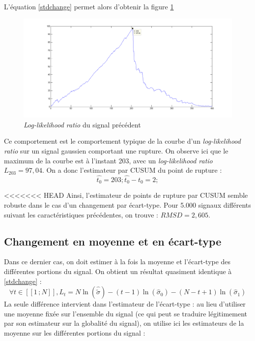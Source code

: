 \documentclass[french,12pt,notitlepage]{report}
\begin{document}
	L'équation \ref{stdchange} permet alors d'obtenir la figure \ref{llr_test_std}
	
	\begin{figure}[h]
		\includegraphics[scale=0.4]{llr_test_std.png}
		\caption{\textit{Log-likelihood ratio} du signal précédent}
		\label{llr_test_std}
	\end{figure}
	
	Ce comportement est le comportement typique de la courbe d'un \textit{log-likelihood ratio} sur un signal gaussien comportant une rupture. On observe ici que le maximum de la courbe est à l'instant 203, avec un \textit{log-likelihood ratio} $L_203 = 97,04$. On a donc l'estimateur par CUSUM du point de rupture :
	\begin{equation*}
		\hat{t_0} = 203 ; \hat{t_0} - t_0 = 2;
	\end{equation*}
	
<<<<<<< HEAD
	Ainsi, l'estimateur de points de rupture par CUSUM semble robuste dans le cas d'un changement par écart-type. Pour 5.000 signaux différents suivant les caractéristiques précédentes, on trouve : $RMSD = 2,605$.
	
	
	\subsection{Changement en moyenne et en écart-type}
	
	
	Dans ce dernier cas, on doit estimer à la fois la moyenne et l'écart-type des différentes portions du signal. On obtient un résultat quasiment identique à \ref{stdchange} :
	\begin{equation}
		\forall t \in [\![1\,;N]\!], L_t = N\ln (\hat{\tilde\sigma}) - (t-1) \ln (\hat\sigma_0) - (N - t + 1) \ln (\hat\sigma_1)
		\label{bothchange}
	\end{equation}
	La seule différence intervient dans l'estimateur de l'écart-type :
	au lieu d'utiliser une moyenne fixée sur l'ensemble du signal (ce qui peut se traduire légitimement par son estimateur sur la globalité du signal),
	on utilise ici les estimateurs  de la moyenne sur les différentes portions du signal :
	
\end{document}
